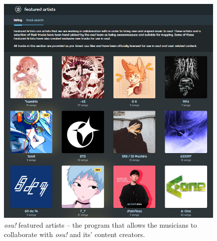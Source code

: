 \begin{figure}[h]
    \centering\includegraphics[scale=0.4]{obrazki/featuredartists.png}
    \caption{\textit{osu!} featured artists -- the program that allows the musicians to collaborate with \textit{osu!} and its' content creators. \cite{osufeatured}}
    \label{fig:osufeatured}
\end{figure}

